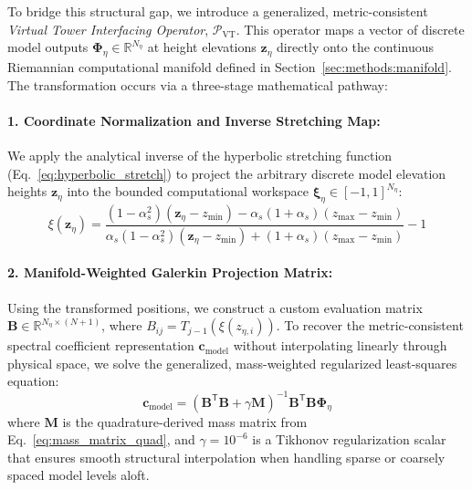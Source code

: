 To bridge this structural gap, we introduce a generalized, metric-consistent \emph{Virtual Tower Interfacing Operator}, $\mathcal{P}_{\mathrm{VT}}$. This operator maps a vector of discrete model outputs $\mathbf{\Phi}_{\eta} \in \mathbb{R}^{N_{\eta}}$ at height elevations $\mathbf{z}_{\eta}$ directly onto the continuous Riemannian computational manifold defined in Section~\ref{sec:methods:manifold}. The transformation occurs via a three-stage mathematical pathway:



\paragraph{1. Coordinate Normalization and Inverse Stretching Map:}
We apply the analytical inverse of the hyperbolic stretching function (Eq.~\ref{eq:hyperbolic_stretch}) to project the arbitrary discrete model elevation heights $\mathbf{z}_{\eta}$ into the bounded computational workspace $\boldsymbol{\xi}_{\eta} \in [-1, 1]^{N_{\eta}}$:
\begin{equation}
\xi(\mathbf{z}_{\eta}) = \frac{(1-\alpha_s^2)(\mathbf{z}_{\eta} - z_{\min}) - \alpha_s(1+\alpha_s)(z_{\max} - z_{\min})}{\alpha_s(1-\alpha_s^2)(\mathbf{z}_{\eta} - z_{\min}) + (1+\alpha_s)(z_{\max} - z_{\min})} - 1
\label{eq:inverse_stretch}
\end{equation}

\paragraph{2. Manifold-Weighted Galerkin Projection Matrix:}
Using the transformed positions, we construct a custom evaluation matrix $\mathbf{B} \in \mathbb{R}^{N_{\eta} \times (N+1)}$, where $B_{ij} = T_{j-1}(\xi(z_{\eta, i}))$. To recover the metric-consistent spectral coefficient representation $\mathbf{c}_{\mathrm{model}}$ without interpolating linearly through physical space, we solve the generalized, mass-weighted regularized least-squares equation:
\begin{equation}
\mathbf{c}_{\mathrm{model}} = \left( \mathbf{B}^{\mathsf{T}} \mathbf{B} + \gamma \mathbf{M} \right)^{-1} \mathbf{B}^{\mathsf{T}} \mathbf{B} \mathbf{\Phi}_{\eta}
\label{eq:virtual_tower_projection}
\end{equation}
where $\mathbf{M}$ is the quadrature-derived mass matrix from Eq.~\ref{eq:mass_matrix_quad}, and $\gamma = 10^{-6}$ is a Tikhonov regularization scalar that ensures smooth structural interpolation when handling sparse or coarsely spaced model levels aloft.

